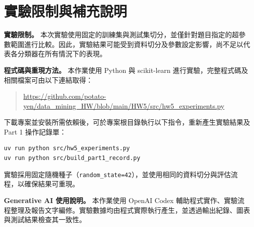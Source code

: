 \section*{實驗限制與補充說明}
\vspace{-0.5em}

\noindent\textbf{實驗限制。}
本次實驗使用固定的訓練集與測試集切分，並僅針對題目指定的超參數範圍進行比較。因此，實驗結果可能受到資料切分及參數設定影響，尚不足以代表各分類器在所有情況下的表現。

\medskip
\noindent\textbf{程式碼與重現方法。}
本作業使用 Python 與 scikit-learn 進行實驗，完整程式碼及相關檔案可由以下連結取得：

\begin{quote}
\url{https://github.com/potato-yen/data_mining_HW/blob/main/HW5/src/hw5_experiments.py}
\end{quote}

下載專案並安裝所需依賴後，可於專案根目錄執行以下指令，重新產生實驗結果及 Part 1 操作記錄單：

\begin{verbatim}
uv run python src/hw5_experiments.py
uv run python src/build_part1_record.py
\end{verbatim}

實驗採用固定隨機種子（\texttt{random\_state=42}），並使用相同的資料切分與評估流程，以確保結果可重現。

\medskip
\noindent\textbf{Generative AI 使用說明。}
本作業使用 OpenAI Codex 輔助程式實作、實驗流程整理及報告文字編修。實驗數據均由程式實際執行產生，並透過輸出紀錄、圖表與測試結果檢查其一致性。
